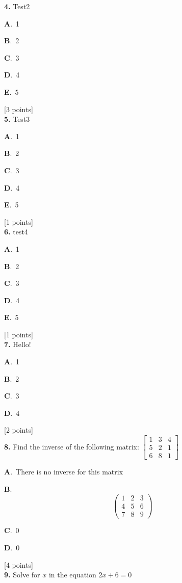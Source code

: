 \documentclass[12pt]{article}
\newcommand{\choice}[3]{%
  \noindent\textbf{#1}.~#2\hfill#3\par\vspace{0.25em}
}
\begin{document}
\noindent \textbf{\textenglish{4.}} {\textenglish{Test2}}

\noindent\choice{A}{{\textenglish{1}}}{}
\noindent\choice{B}{{\textenglish{2}}}{}
\noindent\choice{C}{{\textenglish{3}}}{}
\noindent\choice{D}{{\textenglish{4}}}{}
\noindent\choice{E}{{\textenglish{5}}}{}
\hfill {\textenglish{[3 points]}}\\[0.5em]

\noindent \textbf{\textenglish{5.}} {\textenglish{Test3}}

\noindent\choice{A}{{\textenglish{1}}}{}
\noindent\choice{B}{{\textenglish{2}}}{}
\noindent\choice{C}{{\textenglish{3}}}{}
\noindent\choice{D}{{\textenglish{4}}}{}
\noindent\choice{E}{{\textenglish{5}}}{}
\hfill {\textenglish{[1 points]}}\\[0.5em]

\noindent \textbf{\textenglish{6.}} {\textenglish{test4}}

\noindent\choice{A}{{\textenglish{1}}}{}
\noindent\choice{B}{{\textenglish{2}}}{}
\noindent\choice{C}{{\textenglish{3}}}{}
\noindent\choice{D}{{\textenglish{4}}}{}
\noindent\choice{E}{{\textenglish{5}}}{}
\hfill {\textenglish{[1 points]}}\\[0.5em]

\noindent \textbf{\textenglish{7.}} {\textenglish{Hello!}}

\noindent\choice{A}{{\textenglish{1}}}{}
\noindent\choice{B}{{\textenglish{2}}}{}
\noindent\choice{C}{{\textenglish{3}}}{}
\noindent\choice{D}{{\textenglish{4}}}{}
\hfill {\textenglish{[2 points]}}\\[0.5em]

\noindent \textbf{\textenglish{8.}} {\textenglish{Find the inverse of the following matrix: }}\(\begin{bmatrix} 1 & 3 & 4 \\ 5 & 2 & 1 \\ 6 & 8 & 1 \end{bmatrix}\)

\noindent\choice{A}{{\textenglish{There is no inverse for this matrix}}}{}
\noindent\choice{B}{\[\begin{pmatrix} 1 & 2 & 3 \\ 4 & 5 & 6 \\ 7 & 8 & 9  \end{pmatrix}\]}{}
\noindent\choice{C}{{\textenglish{0}}}{}
\noindent\choice{D}{{\textenglish{0}}}{}
\hfill {\textenglish{[4 points]}}\\[0.5em]

\noindent \textbf{\textenglish{9.}} {\textenglish{Solve for }}\(x \){\textenglish{ in the equation }}\(2x+6 = 0 \)
\end{document}
